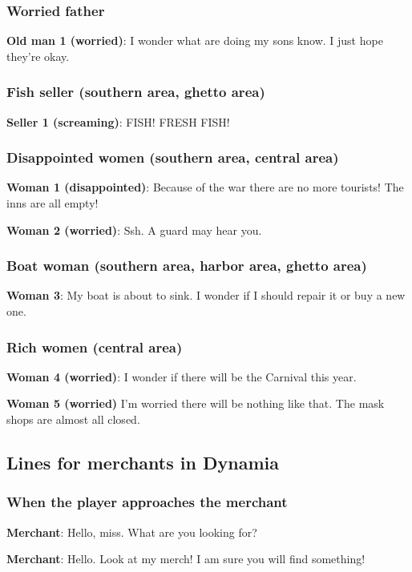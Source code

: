 \subsubsection*{Worried father}
\textbf{Old man 1 (worried)}: I wonder what are doing my sons know. I just hope they're okay.

\subsubsection*{Fish seller (southern area, ghetto area)}
\textbf{Seller 1 (screaming)}: FISH! FRESH FISH!

\subsubsection*{Disappointed women (southern area, central area)}
\textbf{Woman 1 (disappointed)}: Because of the war there are no more tourists! The inns are all empty!

\textbf{Woman 2 (worried)}: Ssh. A guard may hear you.

\subsubsection*{Boat woman (southern area, harbor area, ghetto area)}
\textbf{Woman 3}: My boat is about to sink. I wonder if I should repair it or buy a new one.

\subsubsection*{Rich women (central area)}
\textbf{Woman 4 (worried)}: I wonder if there will be the Carnival this year.

\textbf{Woman 5 (worried)} I'm worried there will be nothing like that. The mask shops are almost all closed.

\subsection{Lines for merchants in Dynamia}
\subsubsection*{When the player approaches the merchant}

\textbf{Merchant}: Hello, miss. What are you looking for?

\textbf{Merchant}: Hello. Look at my merch! I am sure you will find something!



